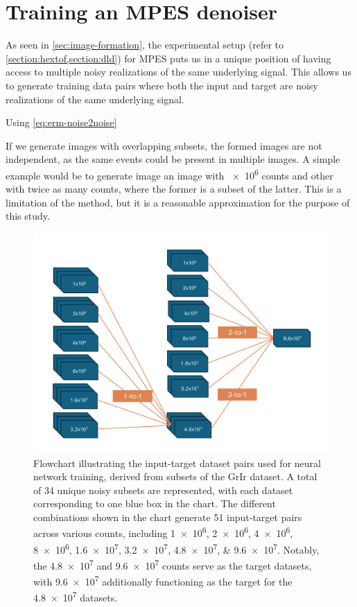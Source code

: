 \section{Training an MPES denoiser}
As seen in \cref{sec:image-formation}, the experimental setup (refer to \cref{section:hextof,section:dld}) for \gls{MPES} puts us in a unique position of having access to multiple noisy realizations of the same underlying signal. This allows us to generate training data pairs where both the input and target are noisy realizations of the same underlying signal.

Using \cref{eq:erm-noise2noise}

If we generate images with overlapping subsets, the formed images are not independent, as the same events could be present in multiple images. A simple example would be to generate image an image with \num{e6} counts and other with twice as many counts, where the former is a subset of the latter. This is a limitation of the method, but it is a reasonable approximation for the purpose of this study.

\begin{figure}[h]
    \centering
    \includegraphics[width=1\linewidth]{images/training_flowchart.pdf}
    \caption{Flowchart illustrating the input-target dataset pairs used for neural network training, derived from subsets of the \gls{GrIr} dataset. A total of \num{34} unique noisy subsets are represented, with each dataset corresponding to one blue box in the chart. The different combinations shown in the chart generate \num{51} input-target pairs across various counts, including \numlist{1e6;2e6;4e6;8e6;1.6e7;3.2e7;4.8e7;9.6e7}. Notably, the \num{4.8e7} and \num{9.6e7} counts serve as the target datasets, with \num{9.6e7} additionally functioning as the target for the \num{4.8e7} datasets.}
    \label{fig:training-data}
\end{figure}

